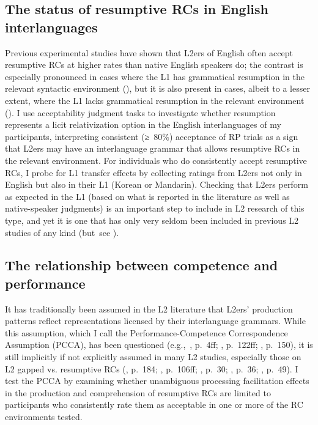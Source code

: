\subsection{The status of resumptive RCs in English interlanguages}

Previous experimental studies have shown that L2ers of English often accept resumptive RCs at higher rates than native English speakers do; the contrast is especially pronounced in cases where the L1 has grammatical resumption in the relevant syntactic environment (\cite{alosaimi2021,hawkins.chan1997,maghrabi1997,marefat.abdollahnejad2014,solaimani.etal2023,tezel1998}), but it is also present in cases, albeit to a lesser extent, where the L1 lacks grammatical resumption in the relevant environment (\cite{hawkins.chan1997,tezel1998}). I use acceptability judgment tasks to investigate whether resumption represents a licit relativization option in the English interlanguages of my participants, interpreting consistent (≥~80\%) acceptance of RP trials as a sign that L2ers may have an interlanguage grammar that allows resumptive RCs in the relevant environment. For individuals who do consistently accept resumptive RCs, I probe for L1 transfer effects by collecting ratings from L2ers not only in English but also in their L1 (Korean or Mandarin). Checking that L2ers perform as expected in the L1 (based on what is reported in the literature as well as native-speaker judgments) is an important step to include in L2 research of this type, and yet it is one that has only very seldom been included in previous L2 studies of any kind (but~see \cite{zenker.schwartz2017}).

\subsection{The relationship between competence and performance}

It has traditionally been assumed in the L2 literature that L2ers' production patterns reflect representations licensed by their interlanguage grammars. While this assumption, which I call the Performance-Competence Correspondence Assumption (PCCA), has been questioned (e.g.,~\cite{kim2016}, p.~4ff; \cite{schwartz1986}, p.~122ff; \cite{schwartz1993}, p.~150), it is still implicitly if not explicitly assumed in many L2 studies, especially those on L2 gapped vs. resumptive RCs (\cite{algady2013}, p.~184; \cite{eckman2004}, p.~106ff; \cite{hyltenstam1984}, p.~30; \cite{marefat.abdollahnejad2014}, p.~36; \cite{pavesi1986}, p.~49). I test the PCCA by examining whether unambiguous processing facilitation effects in the production and comprehension of resumptive RCs are limited to participants who consistently rate them as acceptable in one or more of the RC environments tested.

